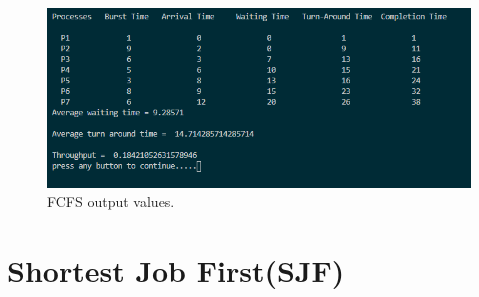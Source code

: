 \documentclass[11pt,a4paper]{report}
\begin{document}
\begin{figure}[H]
	\centering
	\includegraphics[scale=0.8]{./img/fcfs_out.PNG}
	\caption{FCFS output values.}
\end{figure}


\chapter{Shortest Job First(SJF)}
\end{document}

